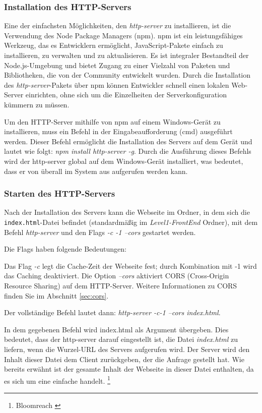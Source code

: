 \subsubsection*{Installation des HTTP-Servers}
Eine der einfachsten Möglichkeiten, den \textit{http-server} zu installieren, ist die Verwendung des Node Package Managers (npm). npm ist ein leistungsfähiges Werkzeug, das es Entwicklern ermöglicht, JavaScript-Pakete einfach zu installieren, zu verwalten und zu aktualisieren. Es ist integraler Bestandteil der Node.js-Umgebung und bietet Zugang zu einer Vielzahl von Paketen und Bibliotheken, die von der Community entwickelt wurden. Durch die Installation des \textit{http-server}-Pakets über npm können Entwickler schnell einen lokalen Web-Server einrichten, ohne sich um die Einzelheiten der Serverkonfiguration kümmern zu müssen.

Um den HTTP-Server mithilfe von npm auf einem Windows-Gerät zu installieren, muss ein Befehl in der Eingabeaufforderung (cmd) ausgeführt werden. Dieser Befehl ermöglicht die Installation des Servers auf dem Gerät und lautet wie folgt: \textit{npm install http-server -g}. Durch die Ausführung dieses Befehls wird der http-server global auf dem Windows-Gerät installiert, was bedeutet, dass er von überall im System aus aufgerufen werden kann.

\subsubsection*{Starten des HTTP-Servers}
Nach der Installation des Servers kann die Webseite im Ordner, in dem sich die \texttt{index.html}-Datei befindet (standardmäßig im \textit{Level1-FrontEnd} Ordner), mit dem Befehl \textit{http-server} und den Flags \textit{-c -1 --cors} gestartet werden.

Die Flags haben folgende Bedeutungen:

Das Flag \textit{-c} legt die Cache-Zeit der Webseite fest; durch Kombination mit -1 wird das Caching deaktiviert. Die Option \textit{--cors} aktiviert CORS (Cross-Origin Resource Sharing) auf dem HTTP-Server. Weitere
Informationen zu CORS finden Sie im Abschnitt \ref{sec:cors}.

Der vollständige Befehl lautet dann: \textit{http-server -c-1 --cors index.html}.

In dem gegebenen Befehl wird index.html als Argument übergeben. Dies bedeutet, dass der http-server darauf eingestellt ist, die Datei \textit{index.html} zu liefern, wenn die Wurzel-URL des Servers aufgerufen wird. Der Server wird den Inhalt dieser Datei dem Client zurückgeben, der die Anfrage gestellt hat. Wie bereits erwähnt ist der gesamte Inhalt der Webseite in dieser Datei enthalten, da es sich um eine einfache  handelt. \footnote{Bloomreach \cite{SPA}}

